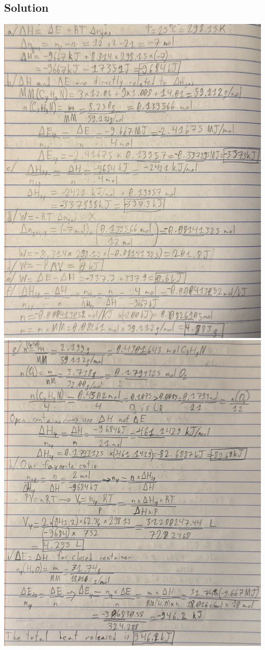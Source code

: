 \documentclass[10pt]{article}
\begin{document}
        \subsection{Solution}
            \begin{center}
                \includegraphics[width=\textwidth]{Answers Images/Problem 19 1.jpg}\\
                \includegraphics[width=\textwidth]{Answers Images/Problem 19 2.jpg}

\end{center}
\end{document}
